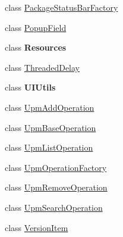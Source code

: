 \begin{DoxyCompactItemize}
\item 
class \mbox{\hyperlink{class_unity_editor_1_1_package_manager_1_1_u_i_1_1_package_status_bar_factory}{Package\+Status\+Bar\+Factory}}
\item 
class \mbox{\hyperlink{class_unity_editor_1_1_package_manager_1_1_u_i_1_1_popup_field}{Popup\+Field}}
\item 
class {\bfseries Resources}
\item 
class \mbox{\hyperlink{class_unity_editor_1_1_package_manager_1_1_u_i_1_1_threaded_delay}{Threaded\+Delay}}
\item 
class {\bfseries U\+I\+Utils}
\item 
class \mbox{\hyperlink{class_unity_editor_1_1_package_manager_1_1_u_i_1_1_upm_add_operation}{Upm\+Add\+Operation}}
\item 
class \mbox{\hyperlink{class_unity_editor_1_1_package_manager_1_1_u_i_1_1_upm_base_operation}{Upm\+Base\+Operation}}
\item 
class \mbox{\hyperlink{class_unity_editor_1_1_package_manager_1_1_u_i_1_1_upm_list_operation}{Upm\+List\+Operation}}
\item 
class \mbox{\hyperlink{class_unity_editor_1_1_package_manager_1_1_u_i_1_1_upm_operation_factory}{Upm\+Operation\+Factory}}
\item 
class \mbox{\hyperlink{class_unity_editor_1_1_package_manager_1_1_u_i_1_1_upm_remove_operation}{Upm\+Remove\+Operation}}
\item 
class \mbox{\hyperlink{class_unity_editor_1_1_package_manager_1_1_u_i_1_1_upm_search_operation}{Upm\+Search\+Operation}}
\item 
class \mbox{\hyperlink{class_unity_editor_1_1_package_manager_1_1_u_i_1_1_version_item}{Version\+Item}}
\end{DoxyCompactItemize}
